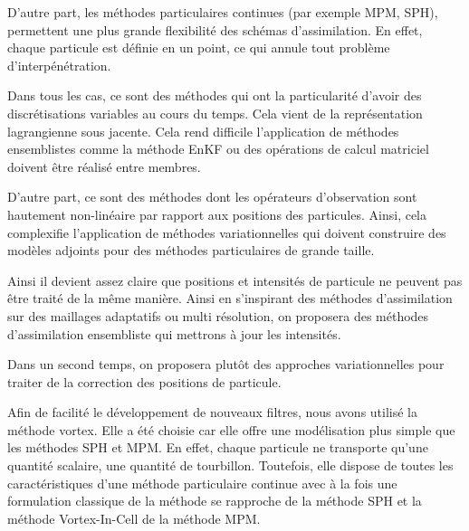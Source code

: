 D'autre part, les méthodes particulaires continues (par exemple MPM, SPH), permettent une plus grande flexibilité des schémas d'assimilation. En effet, chaque particule est définie en un point, ce qui annule tout problème d'interpénétration.

Dans tous les cas, ce sont des méthodes qui ont la particularité d'avoir des discrétisations variables au cours du temps. Cela vient de la représentation lagrangienne sous jacente. Cela rend difficile l'application de méthodes ensemblistes comme la méthode EnKF ou des opérations de calcul matriciel doivent être réalisé entre membres.

D'autre part, ce sont des méthodes dont les opérateurs d'observation sont hautement non-linéaire par rapport aux positions des particules. Ainsi, cela complexifie l'application de méthodes variationnelles qui doivent construire des modèles adjoints pour des méthodes particulaires de grande taille.

Ainsi il devient assez claire que positions et intensités de particule ne peuvent pas être traité de la même manière. Ainsi en s'inspirant des méthodes d'assimilation sur des maillages adaptatifs ou multi résolution, on proposera des méthodes d'assimilation ensembliste qui mettrons à jour les intensités.

Dans un second temps, on proposera plutôt des approches variationnelles pour traiter de la correction des positions de particule.

Afin de facilité le développement de nouveaux filtres, nous avons utilisé la méthode vortex. Elle a été choisie car elle offre une modélisation plus simple que les méthodes SPH et MPM. En effet, chaque particule ne transporte qu'une quantité scalaire, une quantité de tourbillon. Toutefois, elle dispose de toutes les caractéristiques d'une méthode particulaire continue avec à la fois une formulation classique de la méthode se rapproche de la méthode SPH et la méthode Vortex-In-Cell de la méthode MPM.
